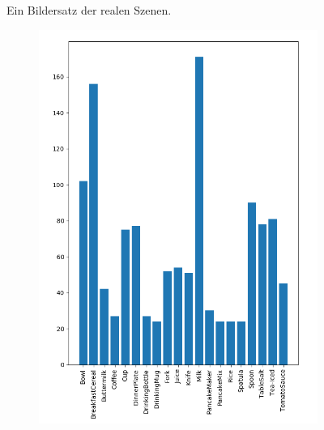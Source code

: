 \begin{figure}
\begin{subfigure}[b]{0.3\textwidth}
	\end{subfigure}
\caption[Reale Bilder einer Szene]{Ein Bildersatz der realen Szenen.}
\label{fig:exampleSceneReal}
\end{figure}

\begin{figure}
\centering
	\begin{subfigure}[b]{0.4\textwidth}
	\centering
		\includegraphics[scale=.4]{img/chapter6/RealGTClass_analysis.png}
	\end{subfigure}
	\begin{subfigure}[b]{0.58\textwidth}
	\centering

\end{subfigure}
\end{figure}
